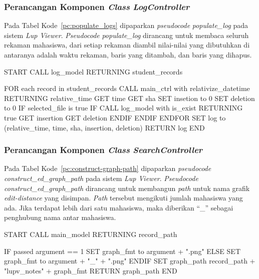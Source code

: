 \subsubsection{Perancangan Komponen \emph{Class} \emph{LogController}}

Pada Tabel Kode~\ref{pc:populate_logs} dipaparkan \emph{pseudocode}
\emph{populate\_log} pada sistem \emph{Lup Viewer}. \emph{Pseudocode}
\emph{populate\_log} dirancang untuk membaca seluruh rekaman
mahasiswa, dari setiap rekaman diambil nilai-nilai yang dibutuhkan
di antaranya adalah waktu rekaman, baris yang ditambah, dan baris yang
dihapus.

\par\null\par
\begin{code}
\begin{ignasicblock}[title=populate\_logs,minted language=text]
START
  CALL log_model RETURNING student_records

  FOR each record in student_records
    CALL main_ctrl with relativize_datetime RETURNING relative_time
    GET time
    GET sha
    SET insetion to 0
    SET deletion to 0
    IF selected_file is true
      IF CALL log_model with is_exist RETURNING true
        GET insertion
        GET deletion
      ENDIF
    ENDIF
  ENDFOR
  SET log to (relative_time, time, sha, insertion, deletion)
  RETURN log
END
\end{ignasicblock}
  \label{pc:populate_logs}
\end{code}

\subsubsection{Perancangan Komponen \emph{Class} \emph{SearchController}}

Pada Tabel Kode~\ref{pc:construct-graph-path} dipaparkan
\emph{pseudocode} \emph{construct\_ed\_graph\_path} pada sistem
\emph{Lup Viewer}. \emph{Pseudocode} \emph{construct\_ed\_graph\_path}
dirancang untuk membangun \emph{path} untuk nama grafik
\emph{edit-distance} yang disimpan. \emph{Path} tersebut mengikuti
jumlah mahasiswa yang ada. Jika terdapat lebih dari satu mahasiswa,
maka diberikan ``\_'' sebagai penghubung nama antar mahasiswa.

\par\null\par
\begin{code}
\begin{ignasicblock}[title=construct\_ed\_graph\_path,minted language=text]
START
  CALL main_model RETURNING record_path

  IF passed argument == 1
    SET graph_fmt to argument + ".png"
  ELSE
    SET graph_fmt to argument + "_" + ".png"
  ENDIF
  SET graph_path record_path + "lupv_notes" + graph_fmt
  RETURN graph_path
END
\end{ignasicblock}
    \label{pc:construct-graph-path}
\end{code}

